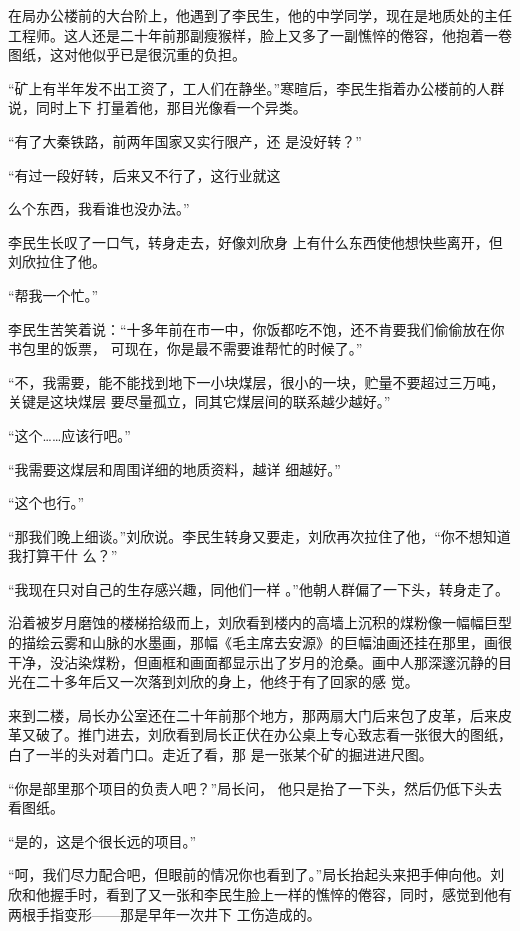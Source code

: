 \documentclass{article}
\begin{document}
在局办公楼前的大台阶上，他遇到了李民生，他的中学同学，现在是地质处的主任工程师。这人还是二十年前那副瘦猴样，脸上又多了一副憔悴的倦容，他抱着一卷图纸，这对他似乎已是很沉重的负担。
 

“矿上有半年发不出工资了，工人们在静坐。”寒暄后，李民生指着办公楼前的人群说，同时上下
打量着他，那目光像看一个异类。 

“有了大秦铁路，前两年国家又实行限产，还
是没好转？” 

“有过一段好转，后来又不行了，这行业就这

\newpage
么个东西，我看谁也没办法。” 

李民生长叹了一口气，转身走去，好像刘欣身
上有什么东西使他想快些离开，但刘欣拉住了他。 


“帮我一个忙。” 

李民生苦笑着说：“十多年前在市一中，你饭都吃不饱，还不肯要我们偷偷放在你书包里的饭票，
可现在，你是最不需要谁帮忙的时候了。” 

“不，我需要，能不能找到地下一小块煤层，很小的一块，贮量不要超过三万吨，关键是这块煤层
要尽量孤立，同其它煤层间的联系越少越好。” 


“这个……应该行吧。” 

“我需要这煤层和周围详细的地质资料，越详
细越好。” 


“这个也行。” 

\newpage

“那我们晚上细谈。”刘欣说。李民生转身又要走，刘欣再次拉住了他，“你不想知道我打算干什
么？” 

“我现在只对自己的生存感兴趣，同他们一样
。”他朝人群偏了一下头，转身走了。 

沿着被岁月磨蚀的楼梯拾级而上，刘欣看到楼内的高墙上沉积的煤粉像一幅幅巨型的描绘云雾和山脉的水墨画，那幅《毛主席去安源》的巨幅油画还挂在那里，画很干净，没沾染煤粉，但画框和画面都显示出了岁月的沧桑。画中人那深邃沉静的目光在二十多年后又一次落到刘欣的身上，他终于有了回家的感
觉。 

来到二楼，局长办公室还在二十年前那个地方，那两扇大门后来包了皮革，后来皮革又破了。推门进去，刘欣看到局长正伏在办公桌上专心致志看一张很大的图纸，白了一半的头对着门口。走近了看，那
是一张某个矿的掘进进尺图。 

\newpage

“你是部里那个项目的负责人吧？”局长问，
他只是抬了一下头，然后仍低下头去看图纸。 


“是的，这是个很长远的项目。” 

“呵，我们尽力配合吧，但眼前的情况你也看到了。”局长抬起头来把手伸向他。刘欣和他握手时，看到了又一张和李民生脸上一样的憔悴的倦容，同时，感觉到他有两根手指变形——那是早年一次井下
工伤造成的。 
\end{document}
